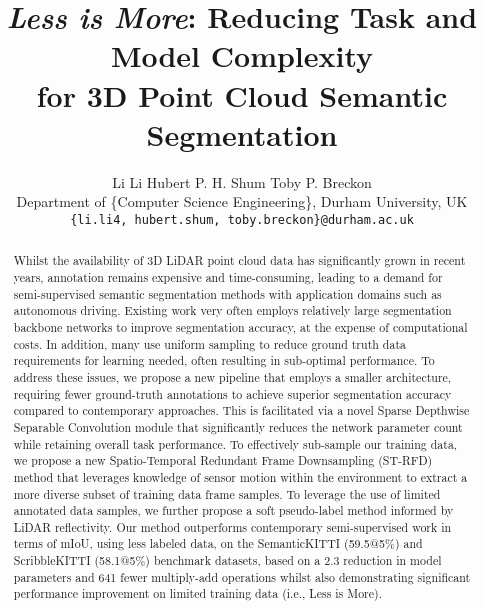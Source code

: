 \documentclass[10pt,twocolumn,letterpaper]{article}
\begin{document}
\title{\vspace{-0.85cm}
\textit{Less is More}: Reducing Task and Model Complexity \\ for 3D Point Cloud Semantic Segmentation
\vspace{-0.55cm}}

\author{Li Li \qquad Hubert P. H. Shum \qquad Toby P. Breckon\\
	Department of \{Computer Science  Engineering\}, Durham University, UK\\
	{\tt\small \{li.li4,\ hubert.shum,\ toby.breckon\}@durham.ac.uk}}

\maketitle 

\newcommand{\ourmodel}{LiM3D}
\newcommand{\ourmodelsdsc}{LiM3D+SDSC}
\newcommand{\samplfull}{Spatio-Temporal Redundant Frame Downsampling}
\newcommand{\samplshort}{ST-RFD}
\newcommand{\ourupl}{Voxel }
\newcommand{\validset}{\textit{validation} set}
\newcommand{\trainset}{\textit{training} set}
\newcommand{\testset}{\textit{test} set}
 \begin{abstract}
    \vspace{-0.2cm}   
    \noindent
    Whilst the availability of 3D LiDAR point cloud data has significantly grown in recent years, annotation remains expensive and time-consuming, leading to a demand for semi-supervised semantic segmentation methods with application domains such as autonomous driving. Existing work very often employs relatively large segmentation backbone networks to improve segmentation accuracy, at the expense of computational costs. In addition, many use uniform sampling to reduce ground truth data requirements for learning needed, often resulting in sub-optimal performance. To address these issues, we propose a new pipeline that employs a smaller architecture, requiring fewer ground-truth annotations to achieve superior segmentation accuracy compared to contemporary approaches. This is facilitated via a novel Sparse Depthwise Separable Convolution module that significantly reduces the network parameter count while retaining overall task performance. To effectively sub-sample our training data, we propose a new {\samplfull} ({\samplshort}) method that leverages knowledge of sensor motion within the environment to extract a more diverse subset of training data frame samples. To leverage the use of limited annotated data samples, we further propose a soft pseudo-label method informed by LiDAR reflectivity. Our method outperforms contemporary semi-supervised work in terms of mIoU, using less labeled data, on the SemanticKITTI (59.5@5\%) and ScribbleKITTI (58.1@5\%) benchmark datasets, based on a 2.3 reduction in model parameters and 641 fewer multiply-add operations whilst also demonstrating significant performance improvement on limited training data (i.e., Less is More).

    
    \vspace{-0.5cm}
\end{abstract} \vspace{-0.3cm}   
\end{document}
